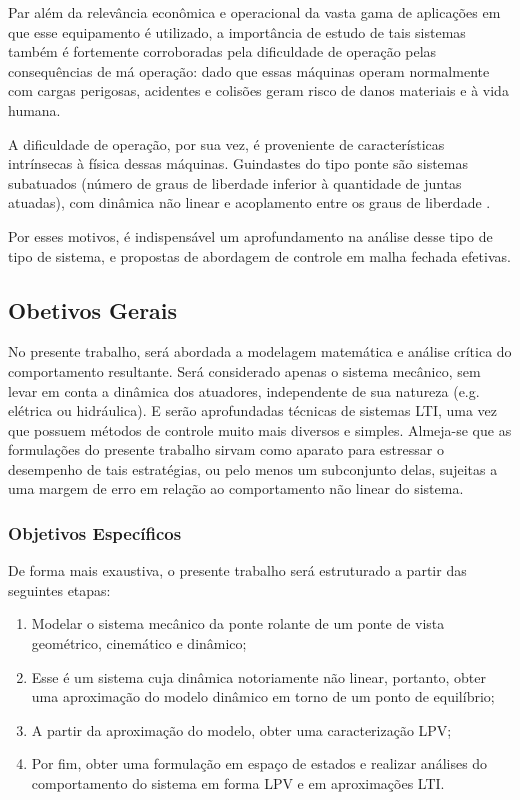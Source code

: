 \documentclass{ppgeesa}
\begin{document}
Par além da relevância econômica e operacional da vasta gama de aplicações em que esse equipamento é utilizado, a importância de estudo de tais sistemas também é fortemente corroboradas pela dificuldade de operação pelas consequências de má operação: dado que essas máquinas operam normalmente com cargas perigosas, acidentes e colisões geram risco de danos materiais e à vida humana.

A dificuldade de operação, por sua vez, é proveniente de características intrínsecas à física dessas máquinas. Guindastes do tipo ponte são sistemas subatuados (número de graus de liberdade inferior à quantidade de juntas atuadas), com dinâmica não linear e acoplamento entre os graus de liberdade \cite{lee}.

Por esses motivos, é indispensável um aprofundamento na análise desse tipo de tipo de sistema, e propostas de abordagem de controle em malha fechada efetivas.

\subsection{Obetivos Gerais}
No presente trabalho, será abordada a modelagem matemática e análise crítica do comportamento resultante. Será considerado apenas o sistema mecânico, sem levar em conta a dinâmica dos atuadores, independente de sua natureza (e.g. elétrica ou hidráulica). E serão aprofundadas técnicas de sistemas LTI, uma vez que possuem métodos de controle muito mais diversos e simples. Almeja-se que as formulações do presente trabalho sirvam como aparato para estressar o desempenho de tais estratégias, ou pelo menos um subconjunto delas, sujeitas a uma margem de erro em relação ao comportamento não linear do sistema.
\subsubsection{Objetivos Específicos}
De forma mais exaustiva, o presente trabalho será estruturado a partir das seguintes etapas:
\begin{enumerate}
  \item Modelar o sistema mecânico da ponte rolante de um ponte de vista geométrico, cinemático e dinâmico;
  \item Esse é um sistema cuja dinâmica notoriamente não linear, portanto, obter uma aproximação do modelo dinâmico em torno de um ponto de equilíbrio;
  \item A partir da aproximação do modelo, obter uma caracterização LPV;
  \item Por fim, obter uma formulação em espaço de estados e realizar análises do comportamento do sistema em forma LPV e em aproximações LTI.
\end{enumerate}
\end{document}
